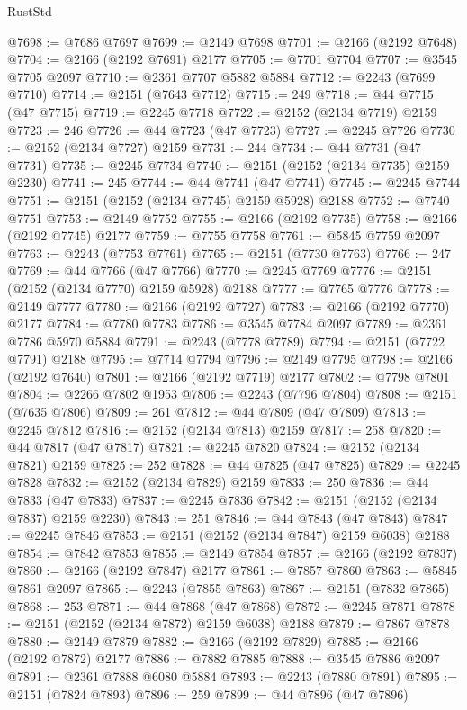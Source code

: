 \begin{lexlean}{RustStd}
\begin{coremodule}
@7698 := @7686 @7697
@7699 := @2149 @7698
@7701 := @2166 (@2192 @7648)
@7704 := @2166 (@2192 @7691) @2177
@7705 := @7701 @7704
@7707 := @3545 @7705 @2097
@7710 := @2361 @7707 @5882 @5884
@7712 := @2243 (@7699 @7710)
@7714 := @2151 (@7643 @7712)
@7715 := 249
@7718 := @44 @7715 (@47 @7715)
@7719 := @2245 @7718
@7722 := @2152 (@2134 @7719) @2159
@7723 := 246
@7726 := @44 @7723 (@47 @7723)
@7727 := @2245 @7726
@7730 := @2152 (@2134 @7727) @2159
@7731 := 244
@7734 := @44 @7731 (@47 @7731)
@7735 := @2245 @7734
@7740 := @2151 (@2152 (@2134 @7735) @2159 @2230)
@7741 := 245
@7744 := @44 @7741 (@47 @7741)
@7745 := @2245 @7744
@7751 := @2151 (@2152 (@2134 @7745) @2159 @5928) @2188
@7752 := @7740 @7751
@7753 := @2149 @7752
@7755 := @2166 (@2192 @7735)
@7758 := @2166 (@2192 @7745) @2177
@7759 := @7755 @7758
@7761 := @5845 @7759 @2097
@7763 := @2243 (@7753 @7761)
@7765 := @2151 (@7730 @7763)
@7766 := 247
@7769 := @44 @7766 (@47 @7766)
@7770 := @2245 @7769
@7776 := @2151 (@2152 (@2134 @7770) @2159 @5928) @2188
@7777 := @7765 @7776
@7778 := @2149 @7777
@7780 := @2166 (@2192 @7727)
@7783 := @2166 (@2192 @7770) @2177
@7784 := @7780 @7783
@7786 := @3545 @7784 @2097
@7789 := @2361 @7786 @5970 @5884
@7791 := @2243 (@7778 @7789)
@7794 := @2151 (@7722 @7791) @2188
@7795 := @7714 @7794
@7796 := @2149 @7795
@7798 := @2166 (@2192 @7640)
@7801 := @2166 (@2192 @7719) @2177
@7802 := @7798 @7801
@7804 := @2266 @7802 @1953
@7806 := @2243 (@7796 @7804)
@7808 := @2151 (@7635 @7806)
@7809 := 261
@7812 := @44 @7809 (@47 @7809)
@7813 := @2245 @7812
@7816 := @2152 (@2134 @7813) @2159
@7817 := 258
@7820 := @44 @7817 (@47 @7817)
@7821 := @2245 @7820
@7824 := @2152 (@2134 @7821) @2159
@7825 := 252
@7828 := @44 @7825 (@47 @7825)
@7829 := @2245 @7828
@7832 := @2152 (@2134 @7829) @2159
@7833 := 250
@7836 := @44 @7833 (@47 @7833)
@7837 := @2245 @7836
@7842 := @2151 (@2152 (@2134 @7837) @2159 @2230)
@7843 := 251
@7846 := @44 @7843 (@47 @7843)
@7847 := @2245 @7846
@7853 := @2151 (@2152 (@2134 @7847) @2159 @6038) @2188
@7854 := @7842 @7853
@7855 := @2149 @7854
@7857 := @2166 (@2192 @7837)
@7860 := @2166 (@2192 @7847) @2177
@7861 := @7857 @7860
@7863 := @5845 @7861 @2097
@7865 := @2243 (@7855 @7863)
@7867 := @2151 (@7832 @7865)
@7868 := 253
@7871 := @44 @7868 (@47 @7868)
@7872 := @2245 @7871
@7878 := @2151 (@2152 (@2134 @7872) @2159 @6038) @2188
@7879 := @7867 @7878
@7880 := @2149 @7879
@7882 := @2166 (@2192 @7829)
@7885 := @2166 (@2192 @7872) @2177
@7886 := @7882 @7885
@7888 := @3545 @7886 @2097
@7891 := @2361 @7888 @6080 @5884
@7893 := @2243 (@7880 @7891)
@7895 := @2151 (@7824 @7893)
@7896 := 259
@7899 := @44 @7896 (@47 @7896)

\end{coremodule}
\end{lexlean}

